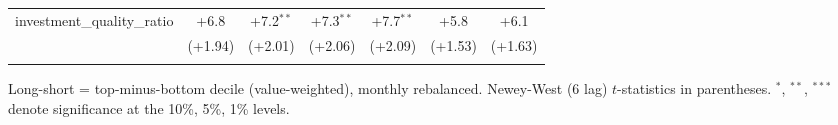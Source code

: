 \begin{table}[htbp]
\begin{threeparttable}
\begin{tabular}{lcccccc}
\addlinespace
investment\_quality\_ratio & +6.8 & +7.2$^{**}$ & +7.3$^{**}$ & +7.7$^{**}$ & +5.8 & +6.1 \\
 & (+1.94) & (+2.01) & (+2.06) & (+2.09) & (+1.53) & (+1.63) \\
\addlinespace
\bottomrule
\end{tabular}
\begin{tablenotes}\footnotesize
\item Long-short = top-minus-bottom decile (value-weighted), monthly rebalanced. Newey-West (6 lag) $t$-statistics in parentheses. $^{*}$, $^{**}$, $^{***}$ denote significance at the 10\%, 5\%, 1\% levels.
\end{tablenotes}
\end{threeparttable}
\end{table}